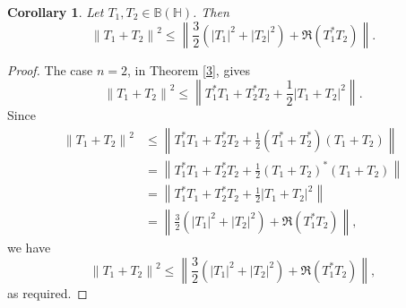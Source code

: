 \documentclass[12pt,twoside,reqno]{amsart}
\newtheorem{corollary}{Corollary}[section]
\numberwithin{equation}{section}
\begin{document}
\begin{corollary}\label{4}
Let ${{T}_{1}},{{T}_{2}}\in \mathbb B\left( \mathbb H \right)$. Then 
	\[{{\left\| {{T}_{1}}+{{T}_{2}} \right\|}^{2}}\le \left\| \frac{3}{2}\left( {{\left| {{T}_{1}} \right|}^{2}}+{{\left| {{T}_{2}} \right|}^{2}} \right)+\Re\left( T_{1}^{*}{{T}_{2}} \right) \right\|.\]
\end{corollary}
\begin{proof}
The case $n=2$, in Theorem \ref{3}, gives
\[{{\left\| {{T}_{1}}+{{T}_{2}} \right\|}^{2}}\le \left\| T_{1}^{*}{{T}_{1}}+T_{2}^{*}{{T}_{2}}+\frac{1}{2}{{\left| {{T}_{1}}+{{T}_{2}} \right|}^{2}} \right\|.\]
Since 
	\[\begin{aligned}
   {{\left\| {{T}_{1}}+{{T}_{2}} \right\|}^{2}}&\le \left\| T_{1}^{*}{{T}_{1}}+T_{2}^{*}{{T}_{2}}+\frac{1}{2}\left( T_{1}^{*}+T_{2}^{*} \right)\left( {{T}_{1}}+{{T}_{2}} \right) \right\| \\ 
 & =\left\| T_{1}^{*}{{T}_{1}}+T_{2}^{*}{{T}_{2}}+\frac{1}{2}{{\left( {{T}_{1}}+{{T}_{2}} \right)}^{*}}\left( {{T}_{1}}+{{T}_{2}} \right) \right\| \\ 
 & =\left\| T_{1}^{*}{{T}_{1}}+T_{2}^{*}{{T}_{2}}+\frac{1}{2}{{\left| {{T}_{1}}+{{T}_{2}} \right|}^{2}} \right\| \\ 
 & =\left\| \frac{3}{2}\left( {{\left| {{T}_{1}} \right|}^{2}}+{{\left| {{T}_{2}} \right|}^{2}} \right)+\Re\left( T_{1}^{*}{{T}_{2}} \right) \right\|,  
\end{aligned}\]
we have
	\[{{\left\| {{T}_{1}}+{{T}_{2}} \right\|}^{2}}\le \left\| \frac{3}{2}\left( {{\left| {{T}_{1}} \right|}^{2}}+{{\left| {{T}_{2}} \right|}^{2}} \right)+\Re\left( T_{1}^{*}{{T}_{2}} \right) \right\|,\]
as required.
\end{proof}
\end{document}
